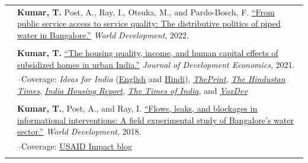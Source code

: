 \documentclass[letterpaper, 10.5pt]{article}
\begin{document}
\begin{longtable}{p{1.5in}p{5in}}
& \textbf{Kumar, T.}  Post, A., Ray, I., Otsuka, M., and Pardo-Bosch, F. \href{https://doi.org/10.1016/j.worlddev.2021.105736}{``From public service access to service quality: The distributive politics of piped water in Bangalore.''} \textit{World Development}, 2022. \\

& \\

&\textbf{Kumar, T.} \href{https://doi.org/10.1016/j.jdeveco.2021.102738}{``The housing quality, income, and human capital effects of subsidized homes in urban India.''} \textit{Journal of Development Economics}, 2021.\\

&--\indent Coverage: \textit{Ideas for India} (\href{https://www.ideasforindia.in/topics/poverty-inequality/household-level-effects-of-affordable-housing-evidence-from-mumbai.html}{English} and \href{https://www.ideasforindia.in/topics/poverty-inequality/household-level-effects-of-affordable-housing-evidence-from-mumbai-hindi.html}{Hindi}), \href{https://theprint.in/opinion/mumbai-residents-win-govt-housing-lottery-and-spend-more-on-kids-education-jobs-study/290485/}{\textit{ThePrint}}, \href{https://www.hindustantimes.com/opinion/housing-is-a-welfare-weapon-it-can-help-people-escape-poverty-101629993983576.html}{\textit{The Hindustan Times}}, \href{https://indiahousingreport.in/outputs/opinion/housing-is-a-welfare-weapon-it-can-help-people-escape-poverty/}{\textit{India Housing Report}}, \href{https://timesofindia.indiatimes.com/city/mumbai/mhada-home-winners-see-upswing-in-family-edu-pay-in-mumbai-study/articleshow/86468320.cms}{\textit{The Times of India}}, and \href{https://voxdev.org/topic/infrastructure-urbanisation/household-level-effects-subsidised-housing-evidence-urban-india?utm_source=dlvr.it&utm_medium=twitter}{\textit{VoxDev}} \\
& \\

&\textbf{Kumar, T.},  Post, A., and Ray, I. \href{https://www.sciencedirect.com/science/article/pii/S0305750X1830032}{``Flows, leaks, and blockages in informational interventions: A field experimental study of Bangalore's water sector.''} \textit{World Development}, 2018.\\

&--\indent Coverage: \href{https://blog.usaid.gov/2016/05/using-mobile-phones-to-alert-households-waiting-for-nextdrop-of-water/}{USAID Impact blog} \\
& \\



\end{longtable}
\end{document}
